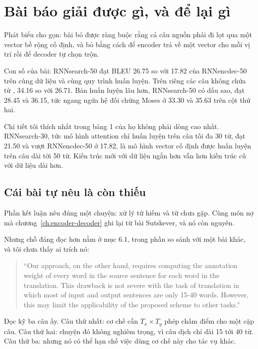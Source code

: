 \section{Bài báo giải được gì, và để lại gì}
\label{sec:ch06-con-lai-gi}

%
Phát biểu cho gọn: bài bỏ được ràng buộc rằng cả câu nguồn phải đi lọt qua một
vector bề rộng cố định, và bỏ bằng cách để encoder trả về một vector cho mỗi vị
trí rồi để decoder tự chọn trộn.

Con số của bài: RNNsearch-50 đạt BLEU 26.75 so với 17.82 của RNNencdec-50 trên
cùng dữ liệu và cùng quy trình huấn luyện. Trên riêng các câu không chứa từ
, 34.16 so với 26.71. Bản huấn luyện lâu
hơn, RNNsearch-50 có dấu sao, đạt 28.45 và 36.15, tức ngang ngửa hệ đối chứng
Moses ở 33.30 và 35.63 trên cột thứ hai.

Chi tiết tôi thích nhất trong bảng 1 của họ không phải dòng cao nhất.
RNNsearch-30, tức mô hình attention chỉ huấn luyện trên câu tối đa 30 từ, đạt
21.50 và vượt RNNencdec-50 ở 17.82, là mô hình vector cố định được huấn luyện
trên câu dài tới 50 từ. Kiến trúc mới với dữ liệu ngắn hơn vẫn hơn kiến trúc cũ
với dữ liệu dài hơn.

\subsection*{Cái bài tự nêu là còn thiếu}

%
Phần kết luận nêu đúng một chuyện: xử lý từ hiếm và từ chưa gặp. Cùng món nợ mà
chương~\ref{ch:encoder-decoder} ghi lại từ bài Sutskever, và nó còn nguyên.

Nhưng chỗ đáng đọc hơn nằm ở mục 6.1, trong phần so sánh với một bài khác, và
tôi chưa thấy ai trích nó:

\begin{quote}
\enquote{Our approach, on the other hand, requires computing the annotation
weight of every word in the source sentence for each word in the translation.
This drawback is not severe with the task of translation in which most of input
and output sentences are only 15-40 words. However, this may limit the
applicability of the proposed scheme to other tasks.}
\end{quote}

Đọc kỹ ba câu ấy. Câu thứ nhất: cơ chế cần \(T_x \times T_y\) phép chấm điểm
cho một cặp câu. Câu thứ hai: chuyện đó không nghiêm trọng, vì câu dịch chỉ dài
15 tới 40 từ. Câu thứ ba: nhưng nó có thể hạn chế việc dùng cơ chế này cho tác
vụ khác.

